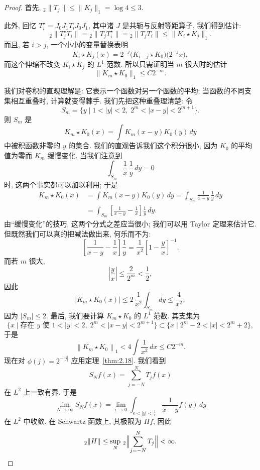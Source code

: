 \begin{proof}
首先, ${}_{2}\|T_{j}\|\leq\|K_{j}\|_{1}=\log 4\leq 3$.

此外, 回忆 $T_i^{\star}=J_0J_1T_iJ_0J_1$, 其中诸 $J$ 是共轭与反射等距算子, 我们得到估计:
\[
{}_{2}\|T_{j}^{\star}T_{i}\|={}_{2}\|T_{j}T_{i}^{\star}\|={}_{2}\|T_{j}T_{i}\|\leq\|K_{i}\star K_{j}\|_{1}.
\]
而且, 若 $i>j$, 一个小小的变量替换表明
\[
K_{i}\star K_{j}(x)=2^{-j}\bigl(K_{i-j}\star K_{0}\bigr)\bigl(2^{-j}x\bigr),
\]
而这个伸缩不改变 $K_i\star K_j$ 的 $L^1$ 范数. 所以只需证明当 $m$ 很大时的估计
\[
\|K_{m}\star K_{0}\|_{1}\leq C2^{-m}.
\]

我们对卷积的直观理解是: 它表示一个函数对另一个函数的平均; 当函数的不同支集相互重叠时, 计算就变得棘手. 我们先把这种重叠理清楚: 令
\[
S_{m}=\{y \mid 1<|y|<2,\; 2^{m}<|x-y|<2^{m+1}\}.
\]
则 $S_{m}$ 是
\[
K_{m}\star K_{0}(x)=\int K_{m}(x-y)K_{0}(y)\,dy
\]
中被积函数非零的 $y$ 的集合. 我们的直观告诉我们这个积分很小, 因为 $K_{0}$ 的平均值为零而 $K_{m}$ 缓慢变化. 当我们注意到
\[
\int_{S_{m}}\frac{1}{x}\,\frac{1}{y}\,dy=0
\]
时, 这两个事实都可以加以利用; 于是
\begin{align*}
K_{m}\star K_{0}(x)&=\int K_{m}(x-y)K_{0}(y)\,dy
=\int_{S_{m}}\frac{1}{x-y}\,\frac{1}{y}\,dy \\
&=\int_{S_{m}}\left[\frac{1}{x-y}-\frac{1}{x}\right]\frac{1}{y}\,dy.
\end{align*}
由``缓慢变化''的技巧, 这两个分式之差应当很小; 我们可以用 Taylor 定理来估计它. 但既然我们可以真的把减法做出来, 何乐而不为:
\[
\left[\frac{1}{x-y}-\frac{1}{x}\right]\frac{1}{y}=\frac{1}{x^{2}}\left[1-\frac{y}{x}\right]^{-1}.
\]
而若 $m$ 很大,
\[
\left|\frac{y}{x}\right|\leq\frac{2}{2^{m}}<\frac{1}{2},
\]
因此
\[
\left|K_{m}\star K_{0}(x)\right|\leq 2\,\frac{1}{x^{2}}\int_{S_{m}}dy\leq\frac{4}{x^{2}},
\]
因为 $|S_m|\leq 2$. 最后, 我们要计算 $K_m\star K_0$ 的 $L^1$ 范数. 其支集为
\[
\{x \mid \text{存在 } y \text{ 使 } 1<|y|<2,\; 2^{m}<|x-y|<2^{m+1}\}
\subset\{x \mid 2^{m}-2<|x|<2^{m}+2\},
\]
于是
\[
\left\|K_{m}\star K_{0}\right\|_{1}<4\int\frac{1}{x^{2}}\,dx\leq C2^{-m}.
\]
现在对 $\phi(j)=2^{-|j|}$ 应用定理~\ref{thm:2.18}. 我们看到
\[
S_{N}f(x)=\sum_{j=-N}^{N}T_{j}f(x)
\]
在 $L^{2}$ 上一致有界. 于是
\[
\lim_{N\to\infty}S_{N}f(x)=\lim_{\epsilon\to0}\int_{\epsilon<|y|<\frac{1}{\epsilon}}\frac{1}{x-y}f(y)\,dy
\]
在 $L^{2}$ 中收敛. 在 Schwartz 函数上, 其极限为 $Hf$, 因此
\[
{}_{2}\|H\|\leq\sup_{N}\,{}_2\Bigl\|\sum_{j=-N}^{N}T_{j}\Bigr\|<\infty. \qedhere
\]
\end{proof}

